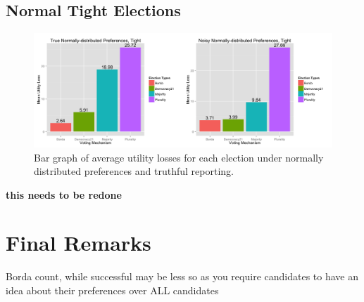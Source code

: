 \documentclass[11pt]{scrartcl}
\begin{document}
\subsection{Normal Tight Elections}

\begin{figure}[H]\center
\includegraphics[scale=0.38]{normal_tight_noisy.png}
\caption{Bar graph of average utility losses for each election under normally distributed preferences and truthful reporting.}
\end{figure}

\textbf{this needs to be redone}


\section{Final Remarks}

Borda count, while successful may be less so as you require candidates to have an idea about their preferences over ALL candidates
\end{document}

